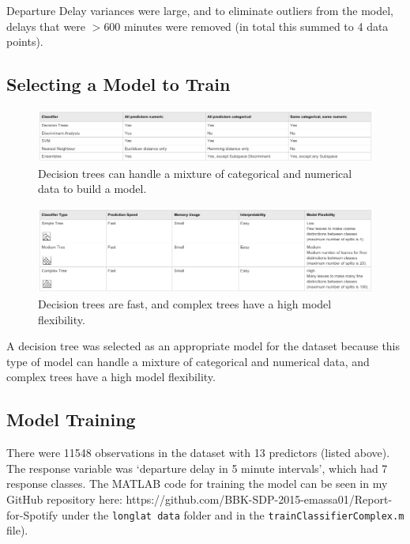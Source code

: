 \documentclass[a4paper, 10pt]{article}
\begin{document}
\vspace{5mm}
Departure Delay variances were large, and to eliminate outliers from the model, delays that were $>$600 minutes were removed (in total this summed to 4 data points).

\subsection{Selecting a Model to Train}

\begin{figure}[H]
\begin{center}
\includegraphics[scale=0.45]{classifiertypes}
\caption{Decision trees can handle a mixture of categorical and numerical data to build a model.}
\label{classifiertypes}
\end{center}
\end{figure}

\begin{figure}[H]
\begin{center}
\includegraphics[scale=0.45]{decisiontrees}
\caption{Decision trees are fast, and complex trees have a high model flexibility.}
\label{decisiontrees}
\end{center}
\end{figure}

A decision tree was selected as an appropriate model for the dataset because this type of model can handle a mixture of categorical and numerical data, and complex trees have a high model flexibility.

\subsection{Model Training}
There were 11548 observations in the dataset with 13 predictors (listed above). The response variable was `departure delay in 5 minute intervals', which had 7 response classes. The MATLAB code for training the model can be seen in my GitHub repository here: https://github.com/BBK-SDP-2015-emassa01/Report-for-Spotify under the \texttt{longlat data} folder and in the \texttt{trainClassifierComplex.m} file).
\end{document}
